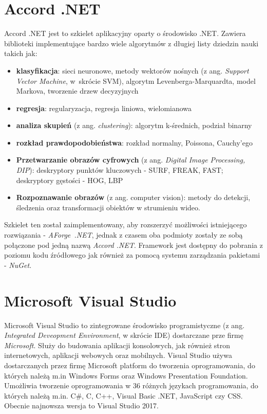 \section{Accord .NET}
Accord .NET jest to szkielet aplikacyjny oparty o środowisko .NET. Zawiera biblioteki implementujące bardzo wiele algorytmów z długiej listy dziedzin nauki takich jak:

\begin{itemize}
	\item \textbf{klasyfikacja}: sieci neuronowe, metody wektorów nośnych (z ang. \textit{Support Vector Machine}, w~skrócie SVM), algorytm Levenberga-Marquardta, model Markova, tworzenie drzew decyzyjnych
	\item \textbf{regresja}: regularyzacja, regresja liniowa, wielomianowa
	\item \textbf{analiza skupień} (z ang. \textit{clustering}): algorytm k-średnich, podział binarny
	\item \textbf{rozkład prawdopodobieństwa}: rozkład normalny, Poissona, Cauchy'ego
	\item \textbf{Przetwarzanie obrazów cyfrowych} (z ang. \textit{Digital Image Processing, DIP}): deskryptory punktów kluczowych - SURF, FREAK, FAST; deskryptory gęstości - HOG, LBP
	\item \textbf{Rozpoznawanie obrazów} (z ang. computer vision): metody do detekcji, śledzenia oraz transformacji obiektów w strumieniu wideo. 
\end{itemize}

Szkielet ten został zaimplementowany, aby rozszerzyć możliwości istniejącego rozwiązania - \textit{AForge~.NET}, jednak z czasem oba podmioty zostały ze sobą połączone pod jedną nazwą \textit{Accord .NET}. Framework jest dostępny do pobrania z poziomu kodu źródłowego jak również za pomocą systemu zarządzania pakietami - \textit{NuGet}.

\section{Microsoft Visual Studio}
Microsoft Visual Studio to zintegrowane środowisko programistyczne (z ang. \textit{Integrated Deveopment Environment}, w skrócie IDE) dostarczane prze firmę \textit{Microsoft}. Służy do budowania aplikacji konsolowych, jak również stron internetowych, aplikacji webowych oraz mobilnych. Visual Studio używa dostarczanych przez firmę Microsoft platform do tworzenia oprogramowania, do których należą m.in Windows Forms oraz Windows Presentation Foundation. Umożliwia tworzenie oprogramowania w 36 różnych językach programowania, do których należą m.in. C\#, C, C++, Visual Basic .NET, JavaScript czy CSS. Obecnie najnowsza wersja to Visual Studio 2017. 

